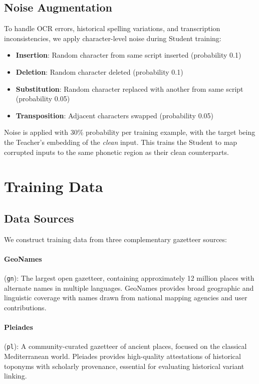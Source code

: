 \documentclass[11pt,a4paper]{article}
\begin{document}
\subsection{Noise Augmentation}

To handle OCR errors, historical spelling variations, and transcription inconsistencies, we apply character-level noise during Student training:

\begin{itemize}
    \item \textbf{Insertion}: Random character from same script inserted (probability 0.1)
    \item \textbf{Deletion}: Random character deleted (probability 0.1)
    \item \textbf{Substitution}: Random character replaced with another from same script (probability 0.05)
    \item \textbf{Transposition}: Adjacent characters swapped (probability 0.05)
\end{itemize}

Noise is applied with 30\% probability per training example, with the target being the Teacher's embedding of the \emph{clean} input. This trains the Student to map corrupted inputs to the same phonetic region as their clean counterparts.


\section{Training Data}
\label{sec:data}

\subsection{Data Sources}

We construct training data from three complementary gazetteer sources:

\paragraph{GeoNames} (\texttt{gn}): The largest open gazetteer, containing approximately 12 million places with alternate names in multiple languages. GeoNames provides broad geographic and linguistic coverage with names drawn from national mapping agencies and user contributions.

\paragraph{Pleiades} (\texttt{pl}): A community-curated gazetteer of ancient places, focused on the classical Mediterranean world. Pleiades provides high-quality attestations of historical toponyms with scholarly provenance, essential for evaluating historical variant linking.
\end{document}
